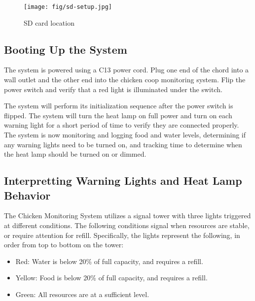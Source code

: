 \documentclass{article}
\begin{document}
\begin{figure}[H]
    \centering
    \texttt{[image: fig/sd-setup.jpg]}
    \caption{SD card location}
    \label{fig:sd-card-location}
\end{figure}

\subsection{Booting Up the System}
The system is powered using a C13 power cord.  Plug one end of the chord into a wall outlet and the other end into the chicken coop monitoring system.  Flip the power switch and verify that a red light is illuminated under the switch.

The system will perform its initialization sequence after the power switch is flipped.  The system will turn the heat lamp on full power and turn on each warning light for a short period of time to verify they are connected properly.  The system is now monitoring and logging food and water levels, determining if any warning lights need to be turned on, and tracking time to determine when the heat lamp should be turned on or dimmed.

\subsection{Interpretting Warning Lights and Heat Lamp Behavior}
The Chicken Monitoring System utilizes a signal tower with three lights triggered at different conditions. The following conditions signal when resources are stable, or require attention for refill. Specifically, the lights represent the following, in order from top to bottom on the tower:

\begin{itemize}
    \item Red: Water is below 20\% of full capacity, and requires a refill.
    \item Yellow: Food is below 20\% of full capacity, and requires a refill.
    \item Green: All resources are at a sufficient level.
\end{itemize}
\end{document}
